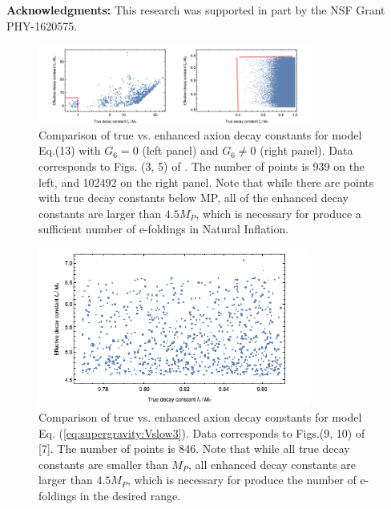 \documentclass[12pt]{article}
\begin{document}
\textbf{Acknowledgments:}
This research was supported in part by the NSF Grant PHY-1620575.

\clearpage

\begin{figure}
  \centering
  \includegraphics[width=0.8\textwidth]{figs/figsusy.png}
  \caption{ Comparison of true vs. enhanced axion decay constants for model Eq.(13) with $G_6 = 0$ (left panel) and
    $G_6 \neq 0$ (right panel). Data corresponds to Figs. (3, 5) of \cite{Nath:2017ihp}.
    The number of points is 939 on the left, and 102492 on the right panel.
    Note that while there are points with true decay constants below
    MP, all of the enhanced decay constants are larger than $4.5 M_P$, which is
    necessary for produce a sufficient number of e-foldings in Natural Inflation.}
  \label{figsusy}
\end{figure}

\begin{figure}
  \centering
  \includegraphics[width=0.8\textwidth]{figs/figsugra.png}
  \caption{ Comparison of true vs. enhanced axion decay constants for model Eq. (\ref{eq:supergravity:Vslow3}). Data corresponds to Figs.(9, 10) of [7]. The number of points is 846. Note that while all true decay constants are smaller than $M_P$, all enhanced decay constants are larger than
    $4.5 M_P$, which is necessary for produce the number of e-foldings in the desired range.}
  \label{figsugra}
\end{figure}
\end{document}
